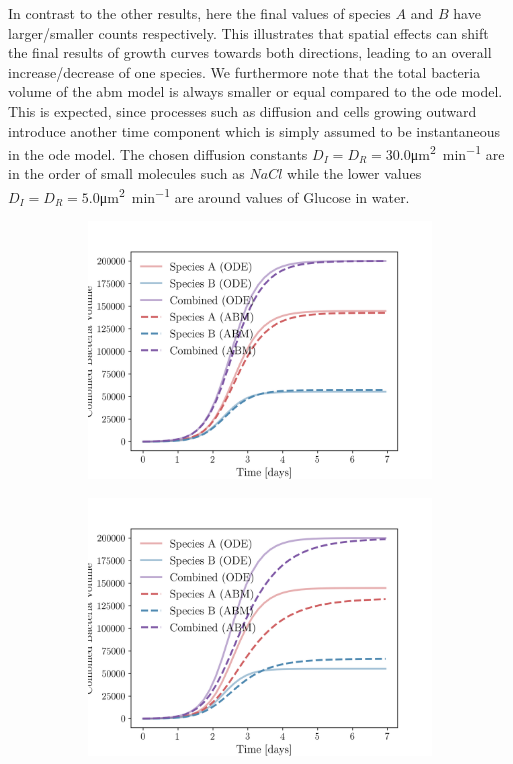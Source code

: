 \documentclass[10pt,twocolumn,5p]{elsarticle}
\numberwithin{equation}{section}
\begin{document}
In contrast to the other results, here the final values of species $A$ and $B$ have larger/smaller counts respectively.
This illustrates that spatial effects can shift the final results of growth curves towards both directions, leading to an overall increase/decrease of one species.
We furthermore note that the total bacteria volume of the \ac{abm} model is always smaller or equal compared to the \ac{ode} model.
This is expected, since processes such as diffusion and cells growing outward introduce another time component which is simply assumed to be instantaneous in the \ac{ode} model.
The chosen diffusion constants $D_I=D_R=30.0$\unit{\micro\metre\squared\per\minute} are in the order of small molecules such as $NaCl$ while the lower values $D_I=D_R=5.0$\unit{\micro\metre\squared\per\minute} are around values of Glucose in water.
\begin{figure}
    \centering
    \begin{subfigure}[c]{0.5\columnwidth}
        \includegraphics[width=\columnwidth]{Figures-abm-homogenous-abm_ode_comparison.png}
    \end{subfigure}%
    \begin{subfigure}[c]{0.5\columnwidth}
        \includegraphics[width=\columnwidth]{Figures-abm-homogenous-low-diffusion-abm_ode_comparison.png}

\end{subfigure}
\end{figure}
\end{document}
